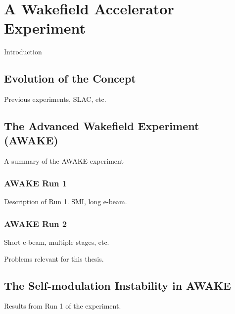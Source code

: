 %
%

\chapter{A Wakefield Accelerator Experiment}
\label{Ch:WFA}

Introduction

\section{Evolution of the Concept}
\label{WFA:History}

Previous experiments, SLAC, etc.

\section{The Advanced Wakefield Experiment (AWAKE)}
\label{WFA:AWAKE}

A summary of the AWAKE experiment

\subsection{AWAKE Run 1}
\label{WFA:AWAKE:R1}

Description of Run 1. SMI, long e-beam.

\subsection{AWAKE Run 2}
\label{WFA:AWAKE:R2}

Short e-beam, multiple stages, etc.

Problems relevant for this thesis.

\section{The Self-modulation Instability in AWAKE}
\label{WFA:SMI}

Results from Run 1 of the experiment.

